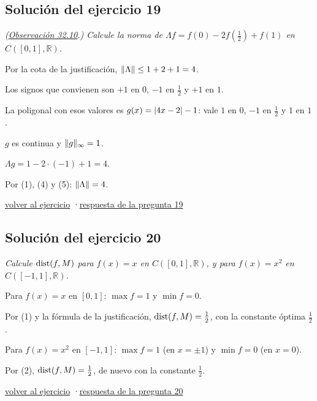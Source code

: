 \documentclass[11pt,a4paper]{article}
\newcommand{\R}{\mathbb{R}}\newcommand{\N}{\mathbb{N}}\newcommand{\Q}{\mathbb{Q}}
\begin{document}
\subsection*{\hypertarget{s-19}{}Solución del ejercicio 19}
\emph{(\href{https://decostruttivismo.github.io/MAT2514-repaso/pdf/MAT2514_apuntes_completos.pdf\#nameddest=teorema.32.10}{Observación 32.10}.) Calcule la norma de $\Lambda f=f(0)-2f(\frac12)+f(1)$ en $C([0,1],\R)$.}
\begin{pasos}
\item[(1)] Por la cota de la justificación, $\lVert \Lambda\rVert\le1+2+1=4$.
\item[(2)] Los signos que convienen son $+1$ en $0$, $-1$ en $\frac12$ y $+1$ en $1$.
\item[(3)] La poligonal con esos valores es $g(x)=\lvert 4x-2\rvert-1$: vale $1$ en $0$, $-1$ en $\frac12$ y $1$ en $1$.
\item[(4)] $g$ es continua y $\lVert g\rVert_\infty=1$.
\item[(5)] $\Lambda g=1-2\cdot(-1)+1=4$.
\item[] Por (1), (4) y (5): $\lVert \Lambda\rVert=4$.
\end{pasos}
\par{\small \hyperlink{x-19}{volver al ejercicio} \quad·\quad \hyperlink{r-19}{respuesta de la pregunta 19}}
\subsection*{\hypertarget{s-20}{}Solución del ejercicio 20}
\emph{Calcule $\operatorname{dist}(f,M)$ para $f(x)=x$ en $C([0,1],\R)$, y para $f(x)=x^2$ en $C([-1,1],\R)$.}
\begin{pasos}
\item[(1)] Para $f(x)=x$ en $[0,1]$: $\max f=1$ y $\min f=0$.
\item[] Por (1) y la fórmula de la justificación, $\operatorname{dist}(f,M)=\frac12$, con la constante óptima $\frac12$.
\item[(2)] Para $f(x)=x^2$ en $[-1,1]$: $\max f=1$ (en $x=\pm1$) y $\min f=0$ (en $x=0$).
\item[] Por (2), $\operatorname{dist}(f,M)=\frac12$, de nuevo con la constante $\frac12$.
\end{pasos}
\par{\small \hyperlink{x-20}{volver al ejercicio} \quad·\quad \hyperlink{r-20}{respuesta de la pregunta 20}}
\end{document}
